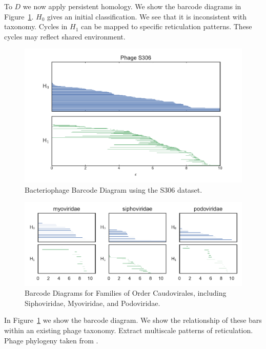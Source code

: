 To $D$ we now apply persistent homology.
We show the barcode diagrams in Figure~\ref{phage:fig:barcode}.
$H_0$ gives an initial classification.
We see that it is inconsistent with taxonomy.
Cycles in $H_1$ can be mapped to specific reticulation patterns.
These cycles may reflect shared environment.

\begin{figure}
\centering
\includegraphics[]{./fig/phage/phage_s306_barcode.pdf}
\caption[Bacteriophage Barcode Diagram]{Bacteriophage Barcode Diagram using the S306 dataset.}
\label{phage:fig:barcode}
\end{figure}

\begin{figure}
\centering
\includegraphics[]{./fig/phage/phage_s306_caudovirales_barcodes.pdf}
\caption[Caudovirales Barcode Diagrams]{Barcode Diagrams for Families of Order Caudovirales, including Siphoviridae, Myoviridae, and Podoviridae.}
\label{phage:fig:caudovirales_barcodes}
\end{figure}

In Figure~\ref{phage:fig:barcode} we show the barcode diagram.
We show the relationship of these bars within an existing phage taxonomy.
Extract multiscale patterns of reticulation.
Phage phylogeny taken from \cite{Glazko:2007dc}.

